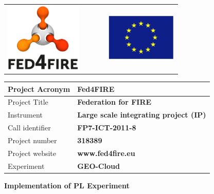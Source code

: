 \documentclass[a4paper]{article}
\title{}
\author{Ruben Perez Pascual}
\date{2014-07-04T11:20:00Z}
\begin{document}
\begin{flushleft}
\tablehead{}
\begin{supertabular}{llll}
 &
 &  & \\
\end{supertabular}
\end{flushleft}

\bigskip


\bigskip

\begin{flushleft}
\tablehead{}
\begin{supertabular}{|m{1.98856in}|m{4.25246in}|}
\hline
Project Acronym &
\bfseries Fed4FIRE\\\hline
Project Title &
\bfseries Federation for FIRE\\\hline
Instrument &
\bfseries Large scale integrating project (IP)\\\hline
Call identifier &
\bfseries FP7-ICT-2011-8\\\hline
Project number &
\bfseries 318389\\\hline
Project website &
\bfseries www.fed4fire.eu\\\hline
Experiment &
\bfseries GEO-Cloud\\\hline
\end{supertabular}
\end{flushleft}

\bigskip


\bigskip

{\centering\bfseries
Implementation of PL Experiment
\par}


\bigskip
\end{document}
